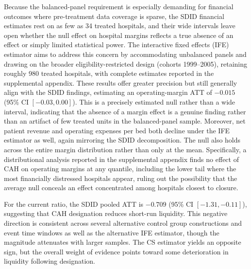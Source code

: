 \documentclass[a4paper, 12pt, twoside]{article}
\begin{document}
Because the balanced-panel requirement is especially demanding for financial outcomes where pre-treatment data coverage is sparse, the SDID financial estimates rest on as few as 34 treated hospitals, and their wide intervals leave open whether the null effect on hospital margins reflects a true absence of an effect or simply limited statistical power. The interactive fixed effects (IFE) estimator aims to address this concern by accommodating unbalanced panels and drawing on the broader eligibility-restricted design (cohorts 1999--2005), retaining roughly 980 treated hospitals, with complete estimates reported in the supplemental appendix. These results offer greater precision but still generally align with the SDID findings, estimating an operating-margin ATT of $-0.015$ (95\% CI $[-0.03, 0.00]$). This is a precisely estimated null rather than a wide interval, indicating that the absence of a margin effect is a genuine finding rather than an artifact of few treated units in the balanced-panel sample. Moreover, net patient revenue and operating expenses per bed both decline under the IFE estimator as well, again mirroring the SDID decomposition. The null also holds across the entire margin distribution rather than only at the mean. Specifically, a distributional analysis reported in the supplemental appendix finds no effect of CAH on operating margins at any quantile, including the lower tail where the most financially distressed hospitals appear, ruling out the possibility that the average null conceals an effect concentrated among hospitals closest to closure.

For the current ratio, the SDID pooled ATT is $-0.709$ (95\% CI $[-1.31, -0.11]$), suggesting that CAH designation reduces short-run liquidity. This negative direction is consistent across several alternative control group constructions and event time windows as well as the alternative IFE estimator, though the magnitude attenuates with larger samples. The CS estimator yields an opposite sign, but the overall weight of evidence points toward some deterioration in liquidity following designation.
\end{document}

